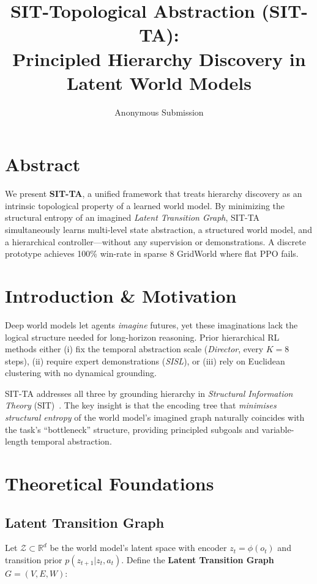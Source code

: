 \documentclass[10pt,twocolumn]{article}
\title{\textbf{SIT-Topological Abstraction (SIT-TA)}:\\
Principled Hierarchy Discovery in Latent World Models}
\author{Anonymous Submission}
\date{}
\begin{document}
\maketitle
\thispagestyle{empty}

\section*{Abstract}
We present \textbf{SIT-TA}, a unified framework that treats hierarchy
discovery as an intrinsic topological property of a learned world model.
By minimizing the structural entropy of an imagined \emph{Latent Transition
Graph}, SIT-TA simultaneously learns multi-level state abstraction, a
structured world model, and a hierarchical controller—without any
supervision or demonstrations.  A discrete prototype achieves 100\%
win-rate in sparse 8 GridWorld where flat PPO fails.

\section{Introduction \& Motivation}
Deep world models let agents \emph{imagine} futures, yet these imaginations
lack the logical structure needed for long-horizon reasoning.  Prior
hierarchical RL methods either (i) fix the temporal abstraction scale
(\textit{Director}, every $K\!=\!8$ steps), (ii) require expert
demonstrations (\textit{SISL}), or (iii) rely on Euclidean clustering with
no dynamical grounding.

SIT-TA addresses all three by grounding hierarchy in
\emph{Structural Information Theory} (SIT)~\cite{li2016}.  The key insight
is that the encoding tree that \emph{minimises structural entropy} of the
world model's imagined graph naturally coincides with the task's
``bottleneck'' structure, providing principled subgoals and variable-length
temporal abstraction.

\section{Theoretical Foundations}

\subsection{Latent Transition Graph}
Let $\mathcal{Z}\!\subset\!\mathbb{R}^d$ be the world model's latent space
with encoder $z_t=\phi(o_t)$ and transition prior $p(z_{t+1}|z_t,a_t)$.
Define the \textbf{Latent Transition Graph} $G=(V,E,W)$:
\end{document}
